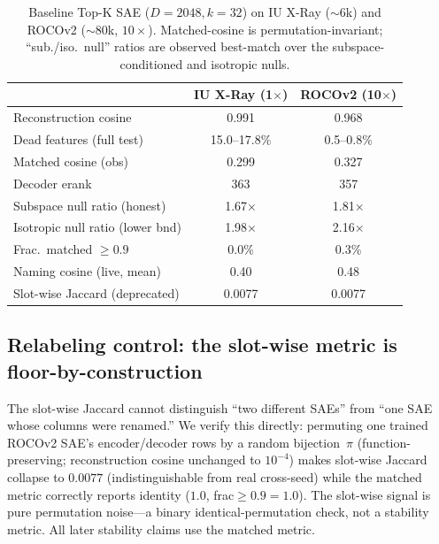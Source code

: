 \documentclass[sigconf, nonacm]{acmart}
\begin{document}
\begin{table}[t]
\caption{Baseline Top-K SAE ($D{=}2048,k{=}32$) on IU X-Ray (${\sim}6$k) and ROCOv2 (${\sim}80$k, $10{\times}$). Matched-cosine is permutation-invariant; ``sub./iso.\ null'' ratios are observed best-match over the subspace-conditioned and isotropic nulls.}
\label{tab:baseline}
\small
\begin{tabular}{lcc}
\toprule
 & IU X-Ray (1$\times$) & ROCOv2 (10$\times$) \\
\midrule
Reconstruction cosine & 0.991 & 0.968 \\
Dead features (full test) & 15.0--17.8\% & 0.5--0.8\% \\
Matched cosine (obs) & 0.299 & 0.327 \\
Decoder erank & 363 & 357 \\
Subspace null ratio (honest) & 1.67$\times$ & 1.81$\times$ \\
Isotropic null ratio (lower bnd) & 1.98$\times$ & 2.16$\times$ \\
Frac.\ matched $\geq0.9$ & 0.0\% & 0.3\% \\
Naming cosine (live, mean) & 0.40 & 0.48 \\
Slot-wise Jaccard (deprecated) & 0.0077 & 0.0077 \\
\bottomrule
\end{tabular}
\end{table}

\subsection{Relabeling control: the slot-wise metric is floor-by-construction}
\label{sec:relabel}
The slot-wise Jaccard cannot distinguish ``two different SAEs'' from ``one SAE whose columns were renamed.'' We verify this directly: permuting one trained ROCOv2 SAE's encoder/decoder rows by a random bijection~$\pi$ (function-preserving; reconstruction cosine unchanged to $10^{-4}$) makes slot-wise Jaccard collapse to $0.0077$ (indistinguishable from real cross-seed) while the matched metric correctly reports identity ($1.0$, frac${\geq}0.9{=}1.0$). The slot-wise signal is pure permutation noise---a binary identical-permutation check, not a stability metric. All later stability claims use the matched metric.
\end{document}
